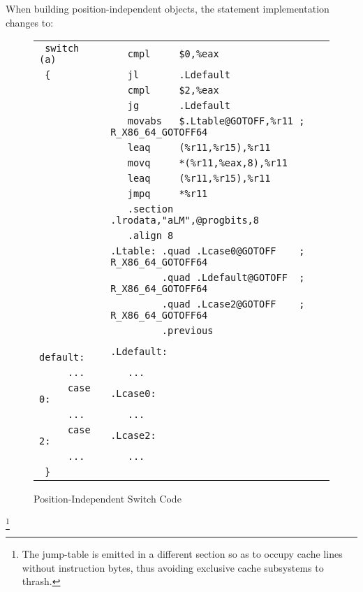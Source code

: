 When building position-independent objects, the 
statement implementation changes to:

\begin{figure}[H]
\Hrule
\caption{Position-Independent Switch Code}\label{large_pic_switch}
\begin{footnotesize}
\begin{tabular}{|l|l|}
\hline
\verb# switch (a)   # & \verb#   cmpl     $0,%eax              # \\
\verb# {            # & \verb#   jl       .Ldefault            # \\
\verb#              # & \verb#   cmpl     $2,%eax              # \\
\verb#              # & \verb#   jg       .Ldefault            # \\
\verb#              # & \verb#   movabs   $.Ltable@GOTOFF,%r11 ; R_X86_64_GOTOFF64 # \\
\verb#              # & \verb#   leaq     (%r11,%r15),%r11     # \\
\verb#              # & \verb#   movq     *(%r11,%eax,8),%r11  # \\
\verb#              # & \verb#   leaq     (%r11,%r15),%r11     # \\
\verb#              # & \verb#   jmpq     *%r11                # \\
\verb#              # & \verb#   .section .lrodata,"aLM",@progbits,8 # \\
\verb#              # & \verb#   .align 8                      # \\
\verb#              # & \verb#.Ltable: .quad .Lcase0@GOTOFF    ; R_X86_64_GOTOFF64 # \\
\verb#              # & \verb#         .quad .Ldefault@GOTOFF  ; R_X86_64_GOTOFF64 # \\
\verb#              # & \verb#         .quad .Lcase2@GOTOFF    ; R_X86_64_GOTOFF64 # \\
\verb#              # & \verb#         .previous               # \\
\verb#     default: # & \verb#.Ldefault:                       # \\
\verb#     ...      # & \verb#   ...                           # \\
\verb#     case 0:  # & \verb#.Lcase0:                         # \\
\verb#     ...      # & \verb#   ...                           # \\
\verb#     case 2:  # & \verb#.Lcase2:                         # \\
\verb#     ...      # & \verb#   ...                           # \\
\verb# }            # & \verb#                                 # \\
\hline
\end{tabular}
\end{footnotesize}
\end{figure}\footnote{The
jump-table is emitted in a different section so as to occupy cache lines
without instruction bytes, thus avoiding exclusive cache
subsystems to thrash.}

